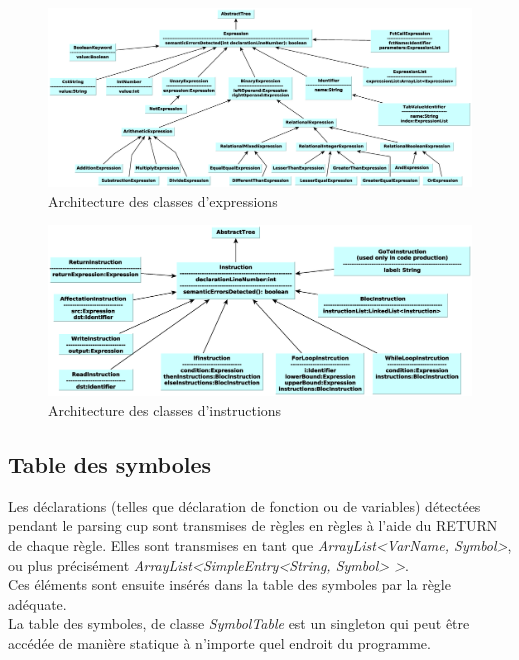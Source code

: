 \documentclass[11pt,a4paper]{article}
\begin{document}
    \begin{figure}[h]
    \includegraphics[width=1\textwidth,center]{../ressources/classesDExpressions.eps}
        \caption{Architecture des classes d'expressions}
   \end{figure}
   \newpage
    \begin{figure}[h]
    \includegraphics[width=1\textwidth,center]{../ressources/classesDInstructions.eps}
        \caption{Architecture des classes d'instructions}
   \end{figure}
  
  \subsection{Table des symboles}
  
  \par Les déclarations (telles que déclaration de fonction ou de variables) détectées pendant le parsing cup sont transmises de règles en règles à l'aide du RETURN de chaque règle. Elles sont transmises en tant que \textit{ArrayList<VarName, Symbol>}, ou plus précisément \textit{ArrayList<SimpleEntry<String, Symbol> >}. \\
  Ces éléments sont ensuite insérés dans la table des symboles par la règle adéquate. \\
  La table des symboles, de classe \textit{SymbolTable} est un singleton qui peut être accédée de manière statique à n'importe quel endroit du programme. 
  
\end{document}
